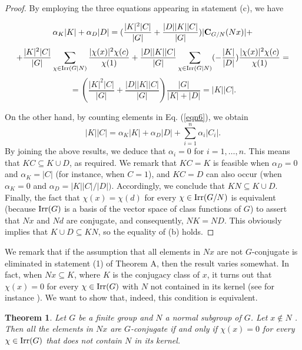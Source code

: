 \documentclass[12pt,leqno,a4paper]{amsart}
\newtheorem{theorem}{Theorem}[section]
\numberwithin{equation}{section}
\begin{document}
\begin{proof}
\noindent
By employing the  three equations appearing in statement (c), we have

  $$ \alpha_K|K| + \alpha_D|D|= (\frac{|K|^2|C|}{|G|} +
  \frac{|D||K||C|}{|G|})|{\bf C}_{G/N}(Nx)| +$$
 $$+ \frac{|K|^2|C|}{|G|}\sum_{\chi\in {\rm Irr}(G|N)}\frac{|\chi(x)|^2\chi(c)}{\chi(1)} +\frac{|D||K||C|}{|G|}
  \sum_{\chi\in {\rm Irr}(G|N)}(-\frac{|K|}{|D|})\frac{|\chi(x)|^2\chi(c)}{\chi(1)}=$$
$$=( \frac{|K|^2|C|}{|G|} +
  \frac{|D||K||C|}{|G|})\frac{|G|}{|K|+|D|}=|K||C|.$$
  
 On the other hand,  by counting elements in Eq. (\ref{eqn6}), we obtain
 $$|K||C|=\alpha_K|K|+ \alpha_D|D| + \sum_{i=1}^n\alpha_i|C_i|.$$
By joining the above results, we deduce that $\alpha_i=0$ for  $i=1,\ldots , n$. This means that $KC\subseteq K\cup D$, as required. We remark that $KC=K$ is feasible when $\alpha_D=0$ and $\alpha_K=|C|$ (for instance, when $C=1$),  and $KC=D$ can also occur (when $\alpha_K=0$ and $\alpha_D=|K||C|/|D|)$.
Accordingly, we conclude that $KN\subseteq K \cup D$. Finally, the fact that $\chi(x)=\chi(d)$ for every $\chi\in {\rm Irr}(G/N)$  is equivalent (because ${\rm Irr}(G)$ is a basis of the vector space of class functions of $G$) to assert that $Nx$ and $Nd$ are conjugate, and consequently, $NK=ND$. This obviously implies that $K\cup D\subseteq KN$, so the equality of (b) holds.
\end{proof}

We remark that  if the assumption  that all elements in $Nx$ are not $G$-conjugate  is eliminated in  statement (1) of  Theorem A, then the result varies somewhat. In fact, when $Nx\subseteq K$, where $K$ is the conjugacy class of $x$, it turns out that $\chi(x)=0$ for every $\chi \in {\rm Irr}(G)$ with $N$  not contained in its kernel (see for instance  \cite[Lemma 3.1]{GN}). We want to show that, indeed, this  condition is equivalent.


\begin{theorem} Let $G$ be a finite group and $N$ a normal subgroup of $G$. Let $x\not\in N$ . Then all the
elements in $Nx$ are $G$-conjugate if and only if $\chi(x)=0$ for every $\chi \in {\rm Irr}(G)$ that does not contain $N$ in its kernel.
\end{theorem}
\end{document}
